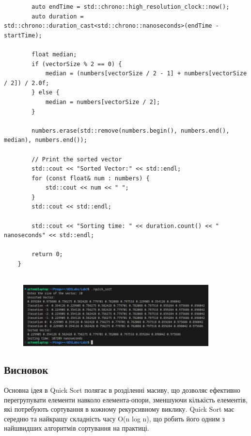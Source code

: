 \documentclass[12pt]{extarticle}
\begin{document}
{\begin{verbatim}
        auto endTime = std::chrono::high_resolution_clock::now();
        auto duration = std::chrono::duration_cast<std::chrono::nanoseconds>(endTime - startTime);
    
        float median;
        if (vectorSize % 2 == 0) {
            median = (numbers[vectorSize / 2 - 1] + numbers[vectorSize / 2]) / 2.0f;
        } else {
            median = numbers[vectorSize / 2];
        }
    
        numbers.erase(std::remove(numbers.begin(), numbers.end(), median), numbers.end());
    
        // Print the sorted vector
        std::cout << "Sorted Vector:" << std::endl;
        for (const float& num : numbers) {
            std::cout << num << " ";
        }
        std::cout << std::endl;
    
        std::cout << "Sorting time: " << duration.count() << " nanoseconds" << std::endl;
    
        return 0;
    }
    
\end{verbatim}
}
\vspace{12pt}
\begin{figure}[H]
    \centering
    \includegraphics[width=0.90\textwidth]{Screenshot_20231017_234955.png}
    \caption{}
\end{figure}
\subsection*{Висновок} 
Основна ідея в Quick Sort полягає в розділенні масиву, що
 дозволяє ефективно перегрупувати елементи навколо елемента-опори, 
 зменшуючи кількість елементів, які потребують сортування в кожному
  рекурсивному виклику. Quick Sort має середню та найкращу складність
   часу O(n log n), що робить його одним з найшвидших алгоритмів 
   сортування на практиці.
\end{document}
